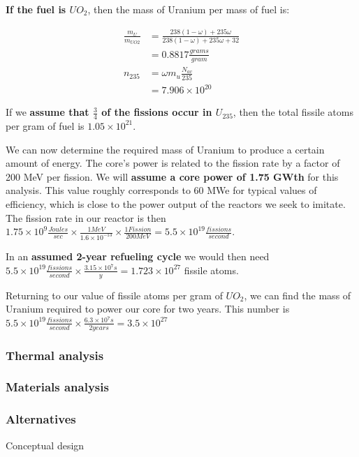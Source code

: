 \documentclass[12pt]{article}
\begin{document}
\textbf{If the fuel is $UO_2$}, then the mass of Uranium per mass of fuel is:

\begin{align}
\frac{m_U}{m_{UO2}} &= \frac{238 (1 - \omega) + 235 \omega}{238 (1 - \omega) + 235 \omega + 32} \\
 &= 0.8817 \frac{grams}{gram} \\
n_{235} &= \omega m_u \frac{N_{av}}{235} \\
 &= 7.906 \times 10^{20}
\end{align}

If we \textbf{assume that $\frac{3}{4}$ of the fissions occur in $U_{235}$}, then the total fissile atoms per gram of fuel is $1.05 \times 10^{21}$. 

We can now determine the required mass of Uranium to produce a certain amount of energy. The core's power is related to the fission rate by a factor of 200 MeV per fission. We will \textbf{assume a core power of 1.75 GWth} for this analysis. This value roughly corresponds to 60 MWe for typical values of efficiency, which is close to the power output of the reactors we seek to imitate. The fission rate in our reactor is then $1.75 \times 10^9 \frac{Joules}{sec} \times \frac{1 MeV}{1.6 \times 10^{-13}} \times \frac{1 Fission}{200 MeV} = 5.5 \times 10^{19} \frac{fissions}{second}$.

In an \textbf{assumed 2-year refueling cycle} we would then need $5.5 \times 10^{19} \frac{fissions}{second} \times \frac{3.15 \times 10^7 s}{y} = 1.723 \times 10^{27}$ fissile atoms. 

Returning to our value of fissile atoms per gram of $UO_2$, we can find the mass of Uranium required to power our core for two years. This number is $5.5 \times 10^{19} \frac{fissions}{second} \times \frac{6.3 \times 10^7 s}{2 years} = 3.5 \times 10^{27}$

\subsubsection{Thermal analysis}
\subsubsection{Materials analysis}
\subsubsection{Alternatives}
Conceptual design
\end{document}
